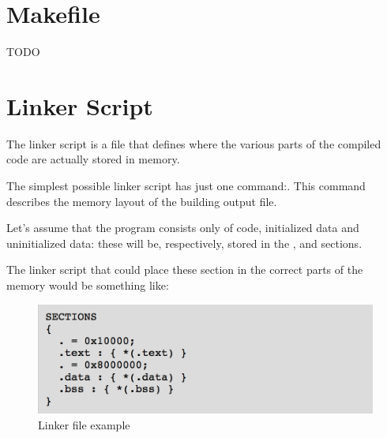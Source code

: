 \section{Makefile}
TODO

\section{Linker Script}
The linker script is a file that defines where the various parts of the compiled code are actually stored in memory.

The simplest possible linker script has just one command:\code[SECTIONS]. This command describes the memory layout of the building output file.

Let's assume that the program consists only of code, initialized data and uninitialized data: these will be, respectively, stored in the \code[.text],  and  sections.

The linker script that could place these section in the correct parts of the memory would be something like:


\begin{figure}[h]
	\centering
	\includegraphics[width=\textwidth/3]{gfx/linker_file}
	
	\caption{Linker file example}
	\label{Fig:Linker File}
\end{figure}

